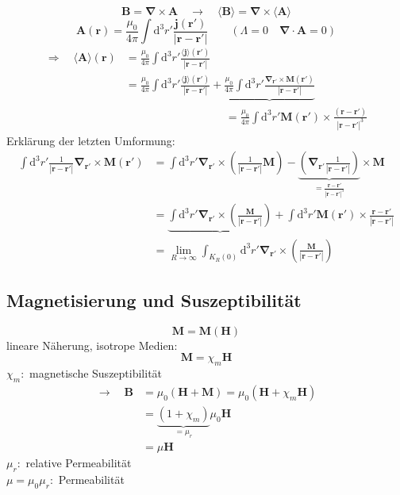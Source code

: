 \documentclass[titlepage,11pt,a4paper,ngerman]{report}
\newcommand{\tx}[1]{\textrm{#1}}
\newcommand{\ub}[1]{\underbrace{#1}}
\newcommand{\dd}{\tx{d}}
\renewcommand{\vec}[1]{\boldsymbol{#1}}
\newcommand{\vabla}{\boldsymbol{\nabla}}
\begin{document}
\begin{equation*}
\vec{B} = \vabla \times \vec{A} \quad \rightarrow \quad \langle \vec{B} \rangle = \vabla \times \langle \vec{A} \rangle
\end{equation*}
\begin{equation*}
\vec{A} (\vec{r}) = \frac{\mu_0}{4 \pi} \int \dd ^3 r' \frac{\vec{j}(\vec{r}')}{|\vec{r} - \vec{r}'|} \qquad (\Lambda = 0 \quad \vabla \cdot \vec{A} = 0)
\end{equation*}
\begin{align*}
\Rightarrow \quad \langle \vec{A} \rangle (\vec{r}) &= \frac{\mu_0}{4 \pi} \int \dd^3r' \frac{\langle \vec{j} \rangle (\vec{r}')}{|\vec{r} - \vec{r}'|}\\
&= \frac{\mu_0}{4 \pi} \int \dd^3 r' \frac{\langle \vec{j} \rangle (\vec{r}')}{|\vec{r} - \vec{r}'|} + \ub{\frac{\mu_0}{4 \pi} \int\dd^3 r ' \frac{\vabla_{\vec{r}'} \times \vec{M} (\vec{r}')}{|\vec{r} - \vec{r}'|}}\\
& \qquad \qquad \qquad \qquad \quad = \frac{\mu_0}{4 \pi} \int \dd^3 r' \vec{M}(\vec{r}') \times \frac{(\vec{r} - \vec{r}')}{|\vec{r} - \vec{r}'|^3}
\end{align*}
Erklärung der letzten Umformung:
\begin{align*}
\int \dd^3 r' \frac{1}{|\vec{r} - \vec{r}'|} \vabla_{\vec{r}'} \times \vec{M} (\vec{r}') &= \int \dd^3 r' \vabla_{\vec{r}'} \times \left(\frac{1}{|\vec{r} - \vec{r}'|} \vec{M}\right) - \ub{\left(\vabla_{\vec{r}'} \frac{1}{|\vec{r} - \vec{r}'|}\right)}_{= \frac{\vec{r} - \vec{r}'}{|\vec{r} - \vec{r}'|^3}} \times \vec{M}\\
&= \ub{\int\dd^3 r' \vabla_{\vec{r}'} \times \left(\frac{\vec{M}}{|\vec{r} - \vec{r}'|}\right)} + \int\dd^3r' \vec{M}(\vec{r}')  \times \frac{\vec{r} - \vec{r}'}{|\vec{r} - \vec{r}'|}\\
&= \lim\limits_{R \to \infty} \int_{K_R(0)} \dd^3 r' \vabla_{\vec{r}'} \times \left(\frac{\vec{M}}{|\vec{r} - \vec{r}'|}\right)
\end{align*}


\subsection{Magnetisierung und Suszeptibilität}

\begin{equation*}
\vec{M} = \vec{M}(\vec{H})
\end{equation*}
lineare Näherung, isotrope Medien:
\begin{equation*}
\vec{M} = \chi_m \vec{H}
\end{equation*}
$ \chi_m : $ magnetische Suszeptibilität
\begin{align*}
\rightarrow \quad \vec{B} &= \mu_0 (\vec{H} + \vec{M}) = \mu_0 (\vec{H} + \chi_m \vec{H})\\
&= \ub{(1 + \chi_m)}_{= \mu_r} \mu_0 \vec{H}\\
&= \mu \vec{H}
\end{align*}
$ \mu_r : $ relative Permeabilität\\
$ \mu = \mu_0 \mu_r : $ Permeabilität
\end{document}
